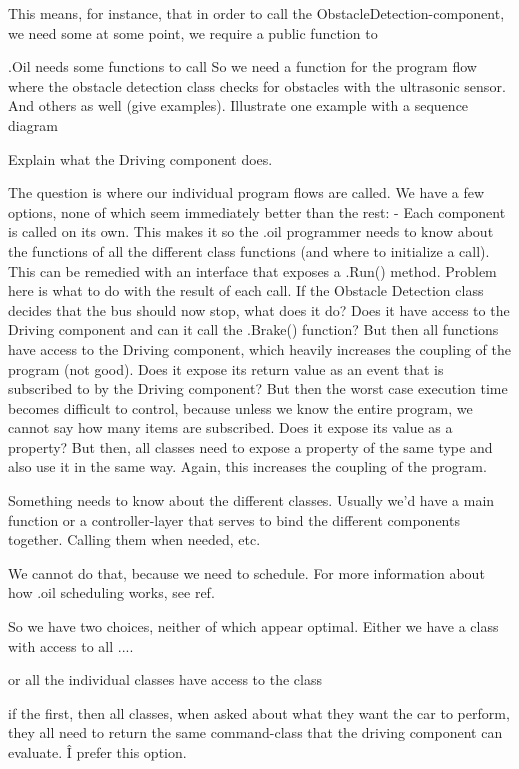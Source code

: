 This means, for instance, that in order to call the ObstacleDetection-component, we need some  at some point, we require a public function to


.Oil needs some functions to call
So we need a function for the program flow where the obstacle detection class checks for obstacles with the ultrasonic sensor. And others as well (give examples).
Illustrate one example with a sequence diagram

Explain what the Driving component does.

The question is where our individual program flows are called. We have a few options, none of which seem immediately better than the rest:
- Each component is called on its own. This makes it so the .oil programmer needs to know about the functions of all the different class functions (and where to initialize a call). This can be remedied with an interface that exposes a .Run() method. Problem here is what to do with the result of each call. If the Obstacle Detection class decides that the bus should now stop, what does it do? Does it have access to the Driving component and can it call the .Brake() function? But then all functions have access to the Driving component, which heavily increases the coupling of the program (not good). Does it expose its return value as an event that is subscribed to by the Driving component? But then the worst case execution time becomes difficult to control, because unless we know the entire program, we cannot say how many items are subscribed. Does it expose its value as a property? But then, all classes need to expose a property of the same type and also use it in the same way. Again, this increases the coupling of the program. 

Something needs to know about the different classes.
Usually we'd have a main function or a controller-layer that serves to bind
the different components together. Calling them when needed, etc. 

We cannot do that, because we need to schedule. For more information about how
.oil scheduling works, see ref. 

So we have two choices, neither of which appear optimal. Either we have a 
class with access to all ....

or all the individual classes have access to the class

if the first, then all classes, when asked about what they want the car to 
perform, they all need to return the same command-class that the
driving component can evaluate. 
Î prefer this option.

